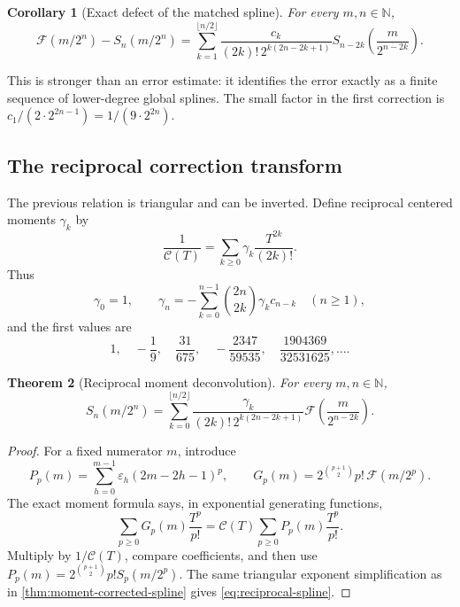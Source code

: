 \documentclass[11pt,oneside]{article}
\newtheorem{theorem}{Theorem}[section]
\newtheorem{corollary}[theorem]{Corollary}
\theoremstyle{definition}
\theoremstyle{remark}
\newcommand{\N}{\mathbb N}
\newcommand{\tm}{\varepsilon}
\begin{document}
\begin{corollary}[Exact defect of the matched spline]
\label{cor:matched-defect}
For every $m,n\in\N$,
\begin{equation}
 \mathcal F(m/2^n)-S_n(m/2^n)
 =\sum_{k=1}^{\lfloor n/2\rfloor}
 \frac{c_k}{(2k)!\,2^{k(2n-2k+1)}}
 S_{n-2k}\!\left(\frac{m}{2^{n-2k}}\right).               \label{eq:matched-defect}
\end{equation}
\end{corollary}

This is stronger than an error estimate: it identifies the error exactly as a finite sequence
of lower-degree global splines.  The small factor in the first correction is
$c_1/(2\cdot2^{2n-1})=1/(9\cdot2^{2n})$.

\subsection{The reciprocal correction transform}

The previous relation is triangular and can be inverted.  Define reciprocal centered moments
$\gamma_k$ by
\begin{equation}
 \frac1{\mathscr C(T)}=
 \sum_{k\ge0}\gamma_k\frac{T^{2k}}{(2k)!}.                \label{eq:gamma-def}
\end{equation}
Thus
\begin{equation}
 \gamma_0=1,
 \qquad
 \gamma_n=-\sum_{k=0}^{n-1}\binom{2n}{2k}\gamma_kc_{n-k}
 \quad(n\ge1),                                             \label{eq:gamma-recurrence}
\end{equation}
and the first values are
\begin{equation}
 1,\quad-\frac19,\quad\frac{31}{675},\quad
 -\frac{2347}{59535},\quad\frac{1904369}{32531625},\ldots. \label{eq:gamma-values}
\end{equation}

\begin{theorem}[Reciprocal moment deconvolution]
\label{thm:reciprocal-spline}
For every $m,n\in\N$,
\begin{equation}
 \boxed{
 S_n(m/2^n)=
 \sum_{k=0}^{\lfloor n/2\rfloor}
 \frac{\gamma_k}{(2k)!\,2^{k(2n-2k+1)}}
 \mathcal F\!\left(\frac{m}{2^{n-2k}}\right).}            \label{eq:reciprocal-spline}
\end{equation}
\end{theorem}

\begin{proof}
For a fixed numerator $m$, introduce
\[
 P_p(m)=\sum_{h=0}^{m-1}\tm_h(2m-2h-1)^p,
 \qquad
 G_p(m)=2^{\binom{p+1}{2}}p!\,\mathcal F(m/2^p).
\]
The exact moment formula says, in exponential generating functions,
\[
 \sum_{p\ge0}G_p(m)\frac{T^p}{p!}
 =\mathscr C(T)\sum_{p\ge0}P_p(m)\frac{T^p}{p!}.
\]
Multiply by $1/\mathscr C(T)$, compare coefficients, and then use
$P_p(m)=2^{\binom{p+1}{2}}p!S_p(m/2^p)$.  The same triangular exponent simplification as in
\cref{thm:moment-corrected-spline} gives \eqref{eq:reciprocal-spline}.
\end{proof}
\end{document}
